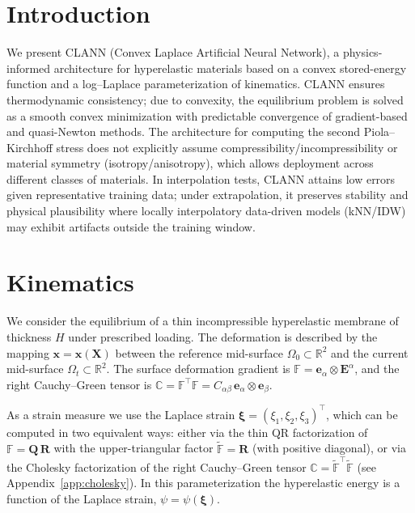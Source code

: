 \documentclass[journal,article,submit,pdftex,moreauthors]{Definitions/mdpi}
\newcommand{\vect}[1]{\boldsymbol{#1}}
\begin{document}
\section{Introduction}

We present CLANN (Convex Laplace Artificial Neural Network), a physics-informed architecture for hyperelastic materials based on a convex stored-energy function and a log–Laplace parameterization of kinematics. CLANN ensures thermodynamic consistency; due to convexity, the equilibrium problem is solved as a smooth convex minimization with predictable convergence of gradient-based and quasi-Newton methods. The architecture for computing the second Piola–Kirchhoff stress does not explicitly assume compressibility/incompressibility or material symmetry (isotropy/anisotropy), which allows deployment across different classes of materials. In interpolation tests, CLANN attains low errors given representative training data; under extrapolation, it preserves stability and physical plausibility where locally interpolatory data-driven models (kNN/IDW) may exhibit artifacts outside the training window.

\section{Kinematics}

We consider the equilibrium of a thin incompressible hyperelastic membrane of thickness $H$ under prescribed loading. The deformation is described by the mapping $\vect{x}=\vect{x}(\vect{X})$ between the reference mid-surface $\Omega_0\subset\mathbb{R}^2$ and the current mid-surface $\Omega_t\subset\mathbb{R}^2$. The surface deformation gradient is $\mathbb F=\vect{e}_{\alpha}\otimes\vect{E}^{\alpha}$, and the right Cauchy–Green tensor is $\mathbb C=\mathbb F^{\top}\mathbb F= C_{\alpha\beta}\,\vect{e}_{\alpha}\otimes\vect{e}_{\beta}$.

As a strain measure we use the Laplace strain $\vect{\xi}=(\xi_1,\xi_2,\xi_3)^{\top}$, which can be computed in two equivalent ways: either via the thin QR factorization of $\mathbb F=\vect Q\,\vect R$ with the upper-triangular factor $\tilde{\mathbb F}=\vect R$ (with positive diagonal), or via the Cholesky factorization of the right Cauchy–Green tensor $\mathbb C=\tilde{\mathbb F}^{\top}\tilde{\mathbb F}$ (see Appendix~\ref{app:cholesky}). In this parameterization the hyperelastic energy is a function of the Laplace strain, $\psi=\psi(\vect{\xi})$.
\end{document}
